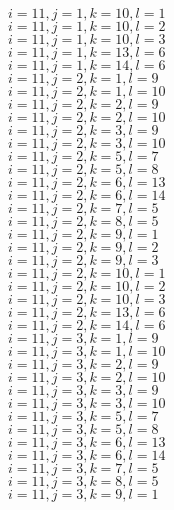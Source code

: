 \documentclass[14pt]{article}
\begin{document}
    $i=11,j=1,k=10,l=1 $ \\ 
    $i=11,j=1,k=10,l=2 $ \\ 
    $i=11,j=1,k=10,l=3 $ \\ 
    $i=11,j=1,k=13,l=6 $ \\ 
    $i=11,j=1,k=14,l=6 $ \\ 
    $i=11,j=2,k=1,l=9 $ \\ 
    $i=11,j=2,k=1,l=10 $ \\ 
    $i=11,j=2,k=2,l=9 $ \\ 
    $i=11,j=2,k=2,l=10 $ \\ 
    $i=11,j=2,k=3,l=9 $ \\ 
    $i=11,j=2,k=3,l=10 $ \\ 
    $i=11,j=2,k=5,l=7 $ \\ 
    $i=11,j=2,k=5,l=8 $ \\ 
    $i=11,j=2,k=6,l=13 $ \\ 
    $i=11,j=2,k=6,l=14 $ \\ 
    $i=11,j=2,k=7,l=5 $ \\ 
    $i=11,j=2,k=8,l=5 $ \\ 
    $i=11,j=2,k=9,l=1 $ \\ 
    $i=11,j=2,k=9,l=2 $ \\ 
    $i=11,j=2,k=9,l=3 $ \\ 
    $i=11,j=2,k=10,l=1 $ \\ 
    $i=11,j=2,k=10,l=2 $ \\ 
    $i=11,j=2,k=10,l=3 $ \\ 
    $i=11,j=2,k=13,l=6 $ \\ 
    $i=11,j=2,k=14,l=6 $ \\ 
    $i=11,j=3,k=1,l=9 $ \\ 
    $i=11,j=3,k=1,l=10 $ \\ 
    $i=11,j=3,k=2,l=9 $ \\ 
    $i=11,j=3,k=2,l=10 $ \\ 
    $i=11,j=3,k=3,l=9 $ \\ 
    $i=11,j=3,k=3,l=10 $ \\ 
    $i=11,j=3,k=5,l=7 $ \\ 
    $i=11,j=3,k=5,l=8 $ \\ 
    $i=11,j=3,k=6,l=13 $ \\ 
    $i=11,j=3,k=6,l=14 $ \\ 
    $i=11,j=3,k=7,l=5 $ \\ 
    $i=11,j=3,k=8,l=5 $ \\ 
    $i=11,j=3,k=9,l=1 $ \\ 
\end{document}
